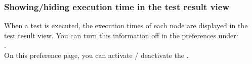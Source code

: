 \subsubsection{Showing/hiding execution time in the test result view}
\label{TasksTestResDecorationPrefs}
When a test is executed, the execution times of each node are displayed in the test result view. You can turn this information off in the preferences under:\\
.\\

On this preference page, you can activate / deactivate the .
